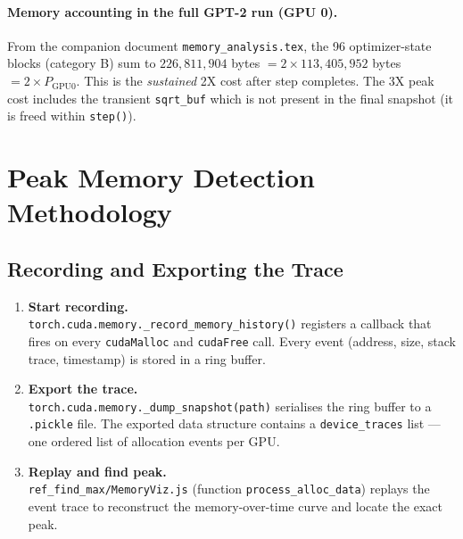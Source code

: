 \documentclass[11pt,a4paper]{article}
\begin{document}
\paragraph{Memory accounting in the full GPT-2 run (GPU 0).}
From the companion document \texttt{memory\_analysis.tex}, the 96
optimizer-state blocks (category B) sum to $226{,}811{,}904$ bytes $= 2
\times 113{,}405{,}952$ bytes $= 2 \times P_{\text{GPU0}}$.  This is the
\emph{sustained} 2X cost after step completes.  The 3X peak cost includes
the transient \texttt{sqrt\_buf} which is not present in the final snapshot
(it is freed within \texttt{step()}).

\section{Peak Memory Detection Methodology}
\label{sec:peak_detection}

\subsection{Recording and Exporting the Trace}

\begin{enumerate}
  \item \textbf{Start recording.} \\
        \texttt{torch.cuda.memory.\_record\_memory\_history()} registers a
        callback that fires on every \texttt{cudaMalloc} and \texttt{cudaFree}
        call.  Every event (address, size, stack trace, timestamp) is stored
        in a ring buffer.

  \item \textbf{Export the trace.} \\
        \texttt{torch.cuda.memory.\_dump\_snapshot(path)} serialises the
        ring buffer to a \texttt{.pickle} file.  The exported data structure
        contains a \texttt{device\_traces} list --- one ordered list of
        allocation events per GPU.

  \item \textbf{Replay and find peak.} \\
        \texttt{ref\_find\_max/MemoryViz.js} (function
        \texttt{process\_alloc\_data}) replays the event trace to
        reconstruct the memory-over-time curve and locate the exact peak.
\end{enumerate}
\end{document}
